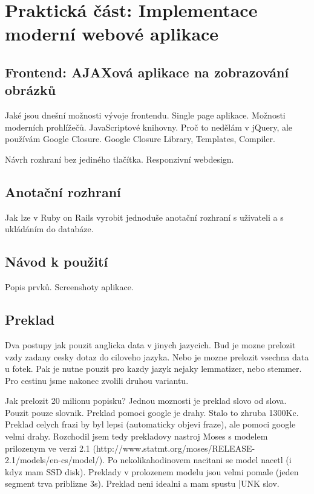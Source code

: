 \chapter{Praktická část: Implementace moderní webové aplikace}

\section{Frontend: AJAXová aplikace na zobrazování obrázků}

Jaké jsou dnešní možnosti vývoje frontendu. Single page aplikace. Možnosti moderních prohlížečů. JavaScriptové knihovny. Proč to nedělám v jQuery, ale používám Google Closure. Google Closure Library, Templates, Compiler.

Návrh rozhraní bez jediného tlačítka. Responzivní webdesign.

\section{Anotační rozhraní}

Jak lze v Ruby on Rails vyrobit jednoduše anotační rozhraní s uživateli a s ukládáním do databáze.

\section{Návod k použití}

Popis prvků. Screenshoty aplikace.

\section{Preklad}

Dva postupy jak pouzit anglicka data v jinych jazycich. Bud je mozne prelozit vzdy zadany cesky dotaz do ciloveho jazyka. Nebo je mozne prelozit vsechna data u fotek. Pak je nutne pouzit pro kazdy jazyk nejaky lemmatizer, nebo stemmer. Pro cestinu jsme nakonec zvolili druhou variantu.

Jak prelozit 20 milionu popisku? Jednou moznosti je preklad slovo od slova. Pouzit pouze slovnik. Preklad pomoci google je drahy. Stalo to zhruba 1300Kc. Preklad celych frazi by byl lepsi (automaticky objevi fraze), ale pomoci google velmi drahy. Rozchodil jsem tedy prekladovy nastroj Moses s modelem prilozenym ve verzi 2.1 (http://www.statmt.org/moses/RELEASE-2.1/models/en-cs/model/). Po nekolikahodinovem nacitani se model nacetl (i kdyz mam SSD disk). Preklady v prolozenem modelu jsou velmi pomale (jeden segment trva priblizne 3s). Preklad neni idealni a mam spustu |UNK slov.

